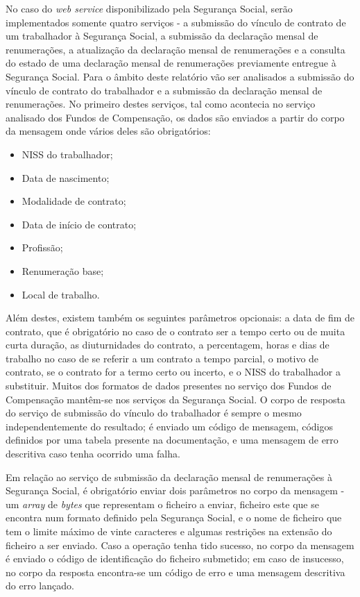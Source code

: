 \documentclass[sigplan]{acmart}
\begin{document}
No caso do \textit{web service} disponibilizado pela Segurança Social, serão implementados somente quatro serviços - a submissão do vínculo de contrato de um trabalhador à Segurança Social, a submissão da declaração mensal de renumerações, a atualização da declaração mensal de renumerações e a consulta do estado de uma declaração mensal de renumerações previamente entregue à Segurança Social. Para o âmbito deste relatório vão ser analisados a submissão do vínculo de contrato do trabalhador e a submissão da declaração mensal de renumerações. No primeiro destes serviços, tal como acontecia no serviço analisado dos Fundos de Compensação, os dados são enviados a partir do corpo da mensagem onde vários deles são obrigatórios:
\begin{itemize}
  \item NISS do trabalhador;
  \item Data de nascimento;
  \item Modalidade de contrato;
  \item Data de início de contrato;
  \item Profissão;
  \item Renumeração base;
  \item Local de trabalho.
\end{itemize}
Além destes, existem também os seguintes parâmetros opcionais: a data de fim de contrato, que é obrigatório no caso de o contrato ser a tempo certo ou de muita curta duração, as diuturnidades do contrato, a percentagem, horas e dias de trabalho no caso de se referir a um contrato a tempo parcial, o motivo de contrato, se o contrato for a termo certo ou incerto, e o NISS do trabalhador a substituir. Muitos dos formatos de dados presentes no serviço dos Fundos de Compensação mantêm-se nos serviços da Segurança Social. O corpo de resposta do serviço de submissão do vínculo do trabalhador é sempre o mesmo independentemente do resultado; é enviado um código de mensagem, códigos definidos por uma tabela presente na documentação, e uma mensagem de erro descritiva caso tenha ocorrido uma falha.

Em relação ao serviço de submissão da declaração mensal de renumerações à Segurança Social, é obrigatório enviar dois parâmetros no corpo da mensagem - um \textit{array} de \textit{bytes} que representam o ficheiro a enviar, ficheiro este que se encontra num formato definido pela Segurança Social, e o nome de ficheiro que tem o limite máximo de vinte caracteres e algumas restrições na extensão do ficheiro a ser enviado. Caso a operação tenha tido sucesso, no corpo da mensagem é enviado o código de identificação do ficheiro submetido; em caso de insucesso, no corpo da resposta encontra-se um código de erro e uma mensagem descritiva do erro lançado.
\end{document}

